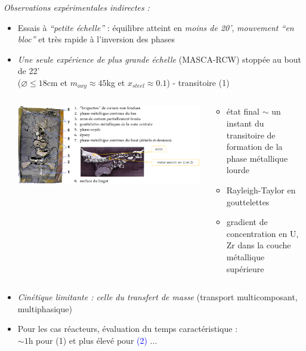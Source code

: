\begin{frame}
	\emph{\small Observations expérimentales indirectes :}
	\begin{itemize}
	\item Essais à \emph{``petite échelle''} : équilibre atteint en \emph{moins de 20'}, \emph{mouvement ``en bloc''} et très rapide à l'inversion des phases
	\item \emph{Une seule expérience de plus grande échelle} (MASCA-RCW) stoppée au bout de 22' \\ ($\diameter \le 18$cm et $m_{oxy} \approx 45$kg et $x_{steel}\approx 0.1$) - transitoire \textcolor{OliveGreen}{(1)}
	\begin{columns}
	\begin{column}{0.65\textwidth}
	\baselineskip
	\includegraphics[width=\textwidth]{Figures/rcw.png}
	\end{column}
	\begin{column}{0.4\textwidth}
	\hskip -0.8cm \begin{minipage}{1.1\textwidth}
	\begin{itemize}
	\item état final $\sim$ un instant du transitoire de formation de la phase métallique lourde
	\item Rayleigh-Taylor en gouttelettes
	\item gradient de concentration en U, Zr dans la couche métallique supérieure
	\end{itemize}
	\end{minipage}
	\end{column}
	\end{columns}
	\item \emph{Cinétique limitante : celle du transfert de masse} (transport multicomposant, multiphasique)
	\item Pour les cas réacteurs, évaluation du temps caractéristique : \\ $\sim 1$h pour \textcolor{OliveGreen}{(1)} et plus élevé pour \textcolor{blue}{(2)} ...
	\end{itemize}
\end{frame}
